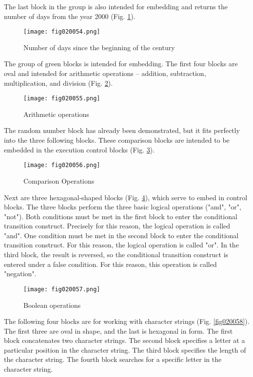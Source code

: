 The last block in the group is also intended for embedding and returns the number of days from the year 2000 (Fig. \ref{fig020054}).

\begin{figure}[H]
   \centering
   \texttt{[image: fig020054.png]}
   \caption{Number of days since the beginning of the century}
\label{fig020054}
\end{figure}

The group of green blocks is intended for embedding. The first four blocks are oval and intended for arithmetic operations – addition, subtraction, multiplication, and division (Fig. \ref{fig020055}).

\begin{figure}[H]
   \centering
   \texttt{[image: fig020055.png]}
   \caption{Arithmetic operations}
\label{fig020055}
\end{figure}

The random number block has already been demonstrated, but it fits perfectly into the three following blocks. These comparison blocks are intended to be embedded in the execution control blocks (Fig. \ref{fig020056}).

\begin{figure}[H]
   \centering
   \texttt{[image: fig020056.png]}
   \caption{Comparison Operations}
\label{fig020056}
\end{figure}

Next are three hexagonal-shaped blocks (Fig. \ref{fig020057}), which serve to embed in control blocks. The three blocks perform the three basic logical operations ("and", "or", "not"). Both conditions must be met in the first block to enter the conditional transition construct. Precisely for this reason, the logical operation is called "and". One condition must be met in the second block to enter the conditional transition construct. For this reason, the logical operation is called "or". In the third block, the result is reversed, so the conditional transition construct is entered under a false condition. For this reason, this operation is called "negation".

\begin{figure}[H]
   \centering
   \texttt{[image: fig020057.png]}
   \caption{Boolean operations}
\label{fig020057}
\end{figure}

The following four blocks are for working with character strings (Fig. \ref{fig020058}). The first three are oval in shape, and the last is hexagonal in form. The first block concatenates two character strings. The second block specifies a letter at a particular position in the character string. The third block specifies the length of the character string. The fourth block searches for a specific letter in the character string.

